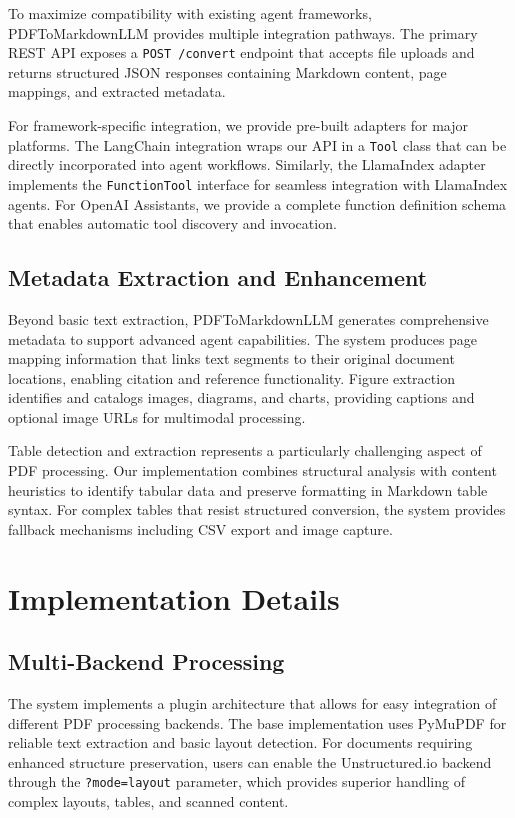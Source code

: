 \documentclass{article}
\begin{document}
To maximize compatibility with existing agent frameworks, PDFToMarkdownLLM provides multiple integration pathways. The primary REST API exposes a \texttt{POST /convert} endpoint that accepts file uploads and returns structured JSON responses containing Markdown content, page mappings, and extracted metadata.

For framework-specific integration, we provide pre-built adapters for major platforms. The LangChain integration wraps our API in a \texttt{Tool} class that can be directly incorporated into agent workflows. Similarly, the LlamaIndex adapter implements the \texttt{FunctionTool} interface for seamless integration with LlamaIndex agents. For OpenAI Assistants, we provide a complete function definition schema that enables automatic tool discovery and invocation.

\subsection{Metadata Extraction and Enhancement}

Beyond basic text extraction, PDFToMarkdownLLM generates comprehensive metadata to support advanced agent capabilities. The system produces page mapping information that links text segments to their original document locations, enabling citation and reference functionality. Figure extraction identifies and catalogs images, diagrams, and charts, providing captions and optional image URLs for multimodal processing.

Table detection and extraction represents a particularly challenging aspect of PDF processing. Our implementation combines structural analysis with content heuristics to identify tabular data and preserve formatting in Markdown table syntax. For complex tables that resist structured conversion, the system provides fallback mechanisms including CSV export and image capture.

\section{Implementation Details}

\subsection{Multi-Backend Processing}

The system implements a plugin architecture that allows for easy integration of different PDF processing backends. The base implementation uses PyMuPDF for reliable text extraction and basic layout detection. For documents requiring enhanced structure preservation, users can enable the Unstructured.io backend through the \texttt{?mode=layout} parameter, which provides superior handling of complex layouts, tables, and scanned content.
\end{document}
